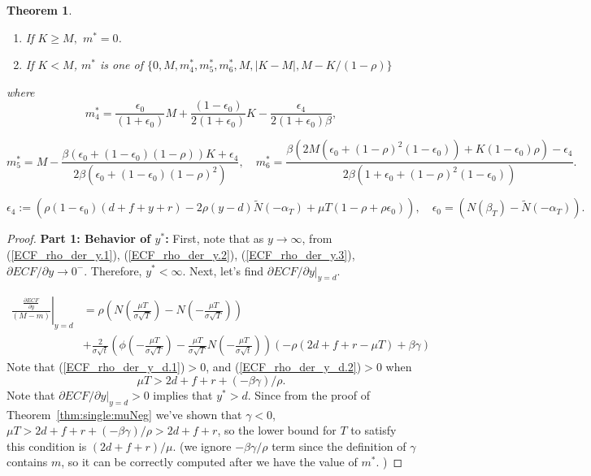 \documentclass[11pt]{article}
\theoremstyle{plain}
\numberwithin{equation}{section}
\newtheorem{thm}{Theorem}[section]
\begin{document}
{{\begin{thm}
\begin{enumerate}
	\item If $K\geq M,$  $m^*=0$.
	\item If $K< M$, $m^*$ is one of $\{0, M, m_4^*, m^*_5, m^*_6, M, |K-M|, M-K/(1-\rho) \}$
\end{enumerate}

where
$$
m^*_4=\frac{\epsilon_0}{(1+\epsilon_0)}M +\frac{(1-\epsilon_0)}{2(1+\epsilon_0)}K-\frac{\epsilon_4}{2(1+\epsilon_0)\beta},
$$

$$m^*_5=M-\frac{\beta(\epsilon_0+(1-\epsilon_0)(1-\rho))K+\epsilon_4}{2\beta(\epsilon_0+(1-\epsilon_0)(1-\rho)^2)}, 
\quad 
m^*_6=\frac{\beta (2M(\epsilon_0+(1-\rho)^2 (1-\epsilon_0)) +K(1-\epsilon_0)\rho)-\epsilon_4}{2\beta (1+\epsilon_0+(1-\rho)^2 (1-\epsilon_0))}.$$


$$\epsilon_4:=\left( \rho(1-\epsilon_0)(d+f+y+r)-2\rho (y-d)\tilde{N}(-\alpha_{T}) +\mu {T}(1-\rho+\rho\epsilon_0) \right), \quad
\epsilon_0= \left(N\left(\beta_{T} \right)-\tilde{N}\left(-\alpha_{T}\right) \right).$$
\end{thm}



}






\begin{proof}
\noindent\textbf{Part 1: Behavior of $y^*$: }First, note that as $y\to \infty$, from (\ref{ECF_rho_der_y.1}), (\ref{ECF_rho_der_y.2}), (\ref{ECF_rho_der_y.3}), $\partial ECF / \partial y\to 0^{-}$. Therefore, $y^*<\infty$.
	Next, let's find  $\left.\partial ECF / \partial y\right|_{y=d}$. 
	
	
	
\begin{align}
\label{ECF_rho_der_y_d.1}
\left.\frac{\frac{\partial ECF}{\partial y}}{ (M-m)} \right|_{y=d}
&=
\rho\left(N\left(\frac{\mu {T}}{\sigma\sqrt{{T}}}\right)-{N}\left(-\frac{\mu {T}}{\sigma\sqrt{{T}}}\right)\right)\\
\label{ECF_rho_der_y_d.2}
&+\frac{2}{\sigma\sqrt{t}}
\left( \phi \left(-\frac{\mu {T}}{\sigma\sqrt{{T}}}\right) -\frac{\mu {T}}{\sigma\sqrt{{T}}} N\left(-\frac{\mu {T}}{\sigma\sqrt{t}}\right)\right)
\left(-\rho (2d+f+r-\mu {T})+ \beta \gamma \right) 
%
\end{align}
Note that (\ref{ECF_rho_der_y_d.1})$>0$, and (\ref{ECF_rho_der_y_d.2})$>0$ when 
\begin{equation}\label{bound:muT}
\mu T>2d+f+r+(-\beta \gamma)/\rho.
\end{equation}
Note that $\left.\partial ECF / \partial y\right|_{y=d}>0$  implies that $y^*>d$. Since from the proof of Theorem~\ref{thm:single:muNeg} we've shown that $\gamma<0$, $\mu T>2d+f+r+(-\beta \gamma)/\rho>2d+f+r$, so the lower bound for $T$ to satisfy this condition is $(2d+f+r)/\mu$. (we ignore $-\beta \gamma/\rho$ term since the definition of $\gamma$ contains $m$, so it can be correctly computed after we have the value of $m^*$. )


\end{proof}}
\end{document}
